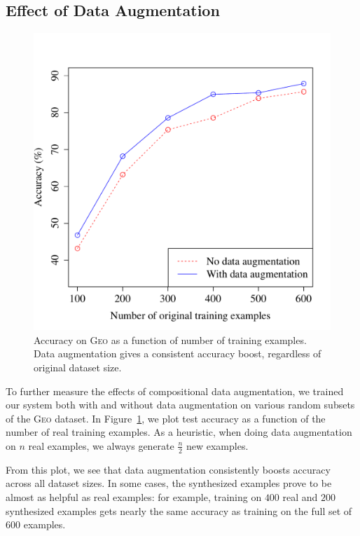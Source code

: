 \documentclass[11pt,letterpaper]{article}
\newcommand{\geo}{\textsc{Geo}\xspace}
\newcommand\rj[1]{\textcolor{blue}{[RJ: #1]}}
\renewcommand\rj[1]{}
\begin{document}
\subsection{Effect of Data Augmentation}
\begin{figure}[t] 
\small
\begin{center} 
  \includegraphics[scale=0.4]{fig-geo-augment.pdf}
\end{center} 
\caption{Accuracy on \geo as a function of number of training examples.
  Data augmentation gives a consistent accuracy boost,
regardless of original dataset size.}
\label{fig:geo-augment}
\end{figure}
\rj{Rewrote quite a bit here, as I think we maybe shouldn't
  focus so much on directly comparing the value of
real and synthesized examples, at least in this subsection}

To further measure the effects of compositional data augmentation,
we trained our system both with and without data augmentation
on various random subsets of the \geo dataset.
In Figure~\ref{fig:geo-augment}, we plot test accuracy as a function of
the number of real training examples.
As a heuristic, when doing data augmentation on $n$ real examples,
we always generate $\frac{n}2$ new examples.

From this plot, we see that data augmentation consistently boosts accuracy
across all dataset sizes.
In some cases, the synthesized examples prove to be
almost as helpful as real examples:
for example, training on $400$ real and $200$ synthesized examples
gets nearly the same accuracy as training on the full set of $600$ examples.
\end{document}
